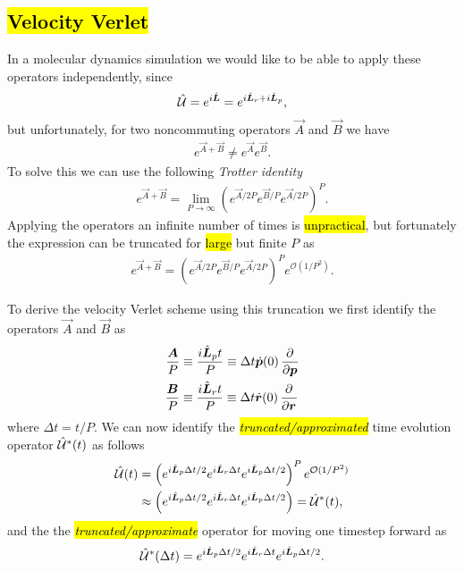 \subsection[Velocity Verlet]{\hl{Velocity Verlet}}
In a molecular dynamics simulation we would like to be able to apply these operators independently, since
\begin{align*}
    \hat{\mathcal{U}} = e^{i\hat{\boldsymbol{L}}} = e^{i\hat{\boldsymbol{L}}_r + i\hat{\boldsymbol{L}}_p},
\end{align*}
but unfortunately, for two noncommuting operators $\vec A$ and $\vec B$ we have
\begin{align*}
    e^{\vec A + \vec B} \neq e^{\vec A} e^{\vec B}.
\end{align*}
To solve this we can use the following \emph{Trotter identity}
\begin{align*}
    e^{\vec A + \vec B} = \lim_{P\rightarrow \infty} \left( e^{\vec A/2P} e^{\vec B/P} e^{\vec A/2P} \right)^P.
\end{align*}
Applying the operators an infinite number of times is \hl{unpractical}, but fortunately the expression can be truncated for \hl{large} but finite $P$ as
\begin{align}
    e^{\vec A + \vec B} = \left( e^{\vec A/2P} e^{\vec B/P} e^{\vec A/2P} \right)^P e^{\mathcal{O}(1/P^2)}.
    \label{eq:liou_time_exact}
\end{align}

To derive the velocity Verlet scheme using this truncation we first identify the operators $\vec A$ and $\vec B$ as
\begin{align*}
    \frac{\vec A}{P} &\equiv \frac{\Liou_p t}{P} \equiv \Delta t \dot {\vec p}(0) \dpd{}{\vec p} \\
    \frac{\vec B}{P} &\equiv \frac{\Liou_r t}{P} \equiv \Delta t \dot \rvec (0) \dpd{}{\rvec}
\end{align*}
where $\Delta t = t/P$. We can now identify the \hl{\emph{truncated/approximated}} time evolution operator $\hat{\mathcal{U}}^*(t)$ as follows
\begin{align}
    \hat{\mathcal{U}}(t) 
    &= \left( e^{i\hat{\boldsymbol{L}}_p\Delta t/2} e^{i\hat{\boldsymbol{L}}_r \Delta t} e^{i\hat{\boldsymbol{L}}_p \Delta t/2} \right)^P e^{\mathcal{O}(1/P^2)} \nonumber\\
    &\approx \left( e^{i\hat{\boldsymbol{L}}_p\Delta t/2} e^{i\hat{\boldsymbol{L}}_r \Delta t} e^{i\hat{\boldsymbol{L}}_p \Delta t/2} \right) = \hat{\mathcal{U}}^*(t),
    \label{eq:liou_time_trunc}
\end{align}
and the the \hl{\emph{truncated/approximate}} operator for moving one timestep forward as
\begin{align}
    \hat{\mathcal{U}}^*(\Delta t) = e^{i\hat{\boldsymbol{L}}_p\Delta t/2} e^{i\hat{\boldsymbol{L}}_r \Delta t} e^{i\hat{\boldsymbol{L}}_p \Delta t/2}.
    \label{eq:liou_onetime_trunc}
\end{align}

